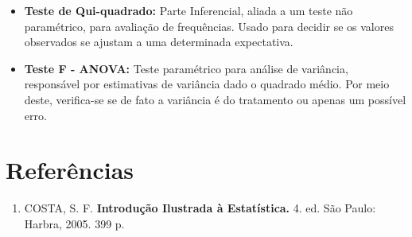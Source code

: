 \documentclass[12pt,a4paper]{article}
\begin{document}
\begin{itemize}
\item \textbf{Teste de Qui-quadrado:} Parte Inferencial, aliada a um teste não paramétrico, para avaliação de frequências. Usado para decidir se os valores observados se ajustam a uma determinada expectativa.
\end{itemize}

\begin{itemize}
\item \textbf{Teste F - ANOVA:} Teste paramétrico para análise de variância, responsável por estimativas de variância dado o quadrado médio. Por meio deste, verifica-se se de fato a variância é do tratamento ou apenas um possível erro.
\end{itemize}

\section{Referências}
\begin{enumerate}

\item COSTA, S. F. \textbf{Introdução Ilustrada à Estatística.} 4. ed. São Paulo: Harbra, 2005. 399 p.

\end{enumerate}
\end{document}
